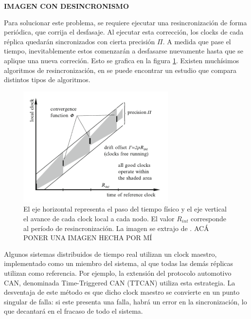 {\Large \textbf{{\color{red} IMAGEN CON DESINCRONISMO}}}

Para solucionar este problema, se requiere ejecutar una resincronización de forma periódica, que corrija el desfasaje. Al ejecutar esta corrección, los clocks de cada réplica quedarán sincronizados con cierta precisión $\Pi$. A medida que pase el tiempo, inevitablemente estos comenzarán a desfasarse nuevamente hasta que se aplique una nueva correción. Esto se grafica en la figura \ref{fig:TTA_resincronizacion}. Existen muchísimos algoritmos de resincronización, en \cite{anceaume1998performance} se puede encontrar un estudio que compara distintos tipos de algoritmos.

\begin{figure}[H]
    \centering
    \includegraphics[width=0.7\textwidth]{img/TTA_resincronizacion.png}
    \caption{El eje horizontal representa el paso del tiempo físico y el eje vertical el avance de cada clock local a cada nodo. El valor $R_{int}$ corresponde al período de resincronización. La imagen se extrajo de \cite[p.~67]{kopetz-2011}.{\color{red} ACÁ PONER UNA IMAGEN HECHA POR MÍ} }
    \label{fig:TTA_resincronizacion}    
\end{figure}


Algunos sistemas distribuidos de tiempo real utilizan un clock maestro, implementado como un miembro del sistema, al que todas las demás réplicas utilizan como referencia. Por ejemplo, la extensión del protocolo automotivo CAN, denominada Time-Triggered CAN (TTCAN) \cite{leen2002ttcan} utiliza esta estrategia. La desventaja de este método es que dicho clock maestro se convierte en un punto singular de falla: si este presenta una falla, habrá un error en la sincronización, lo que decantará en el fracaso de todo el sistema.

